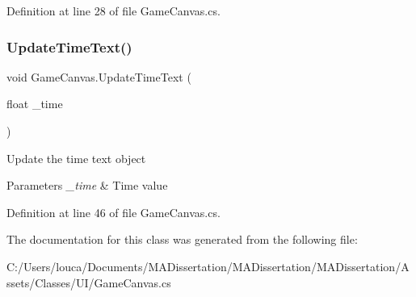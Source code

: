 Definition at line 28 of file Game\+Canvas.\+cs.

\mbox{\label{class_game_canvas_a92dd51c7702d5d4e9e14902f3b31ba30}} 
\subsubsection{\texorpdfstring{Update\+Time\+Text()}{UpdateTimeText()}}
{\footnotesize\ttfamily void Game\+Canvas.\+Update\+Time\+Text (\begin{DoxyParamCaption}\item[{float}]{\+\_\+time }\end{DoxyParamCaption})}



Update the time text object 


\begin{DoxyParams}{Parameters}
{\em \+\_\+time} & Time value\\
\hline
\end{DoxyParams}


Definition at line 46 of file Game\+Canvas.\+cs.



The documentation for this class was generated from the following file\+:\begin{DoxyCompactItemize}
\item 
C\+:/\+Users/louca/\+Documents/\+M\+A\+Dissertation/\+M\+A\+Dissertation/\+M\+A\+Dissertation/\+Assets/\+Classes/\+U\+I/Game\+Canvas.\+cs\end{DoxyCompactItemize}
